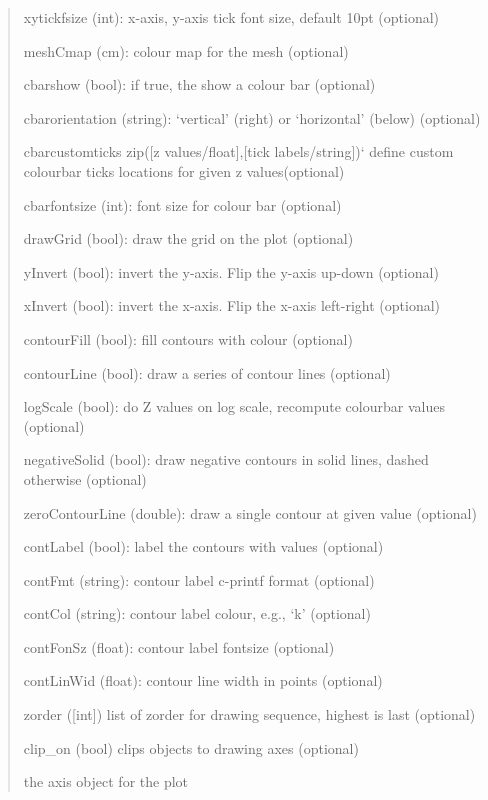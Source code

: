 \documentclass[a4paper,10pt,english]{sphinxmanual}
\begin{document}
\begin{fulllineitems}
\begin{fulllineitems}
\begin{quote}
\begin{description}
\begin{DUlineblock}{0em}
\item[] xytickfsize (int): x-axis, y-axis tick font size, default 10pt (optional)
\item[] meshCmap (cm): colour map for the mesh (optional)
\item[] cbarshow (bool): if true, the show a colour bar (optional)
\item[] cbarorientation (string): `vertical' (right) or `horizontal' (below) (optional)
\item[] cbarcustomticks zip({[}z values/float{]},{[}tick labels/string{]}){}`  define custom colourbar ticks locations for given z values(optional)
\item[] cbarfontsize (int): font size for colour bar (optional)
\item[] drawGrid (bool): draw the grid on the plot (optional)
\item[] yInvert (bool): invert the y-axis. Flip the y-axis up-down (optional)
\item[] xInvert (bool): invert the x-axis. Flip the x-axis left-right (optional)
\item[] contourFill (bool): fill contours with colour (optional)
\item[] contourLine (bool): draw a series of contour lines (optional)
\item[] logScale (bool): do Z values on log scale, recompute colourbar values (optional)
\item[] negativeSolid (bool): draw negative contours in solid lines, dashed otherwise (optional)
\item[] zeroContourLine (double): draw a single contour at given value (optional)
\item[] contLabel (bool): label the contours with values (optional)
\item[] contFmt (string): contour label c-printf format (optional)
\item[] contCol (string): contour label colour, e.g., `k' (optional)
\item[] contFonSz (float): contour label fontsize (optional)
\item[] contLinWid (float): contour line width in points (optional)
\item[] zorder ({[}int{]}) list of zorder for drawing sequence, highest is last (optional)
\item[] clip\_on (bool) clips objects to drawing axes (optional)
\end{DUlineblock}

\item[{Returns:}] \leavevmode
\begin{DUlineblock}{0em}
\item[] the axis object for the plot
\end{DUlineblock}


\end{description}
\end{quote}
\end{fulllineitems}
\end{fulllineitems}
\end{document}
